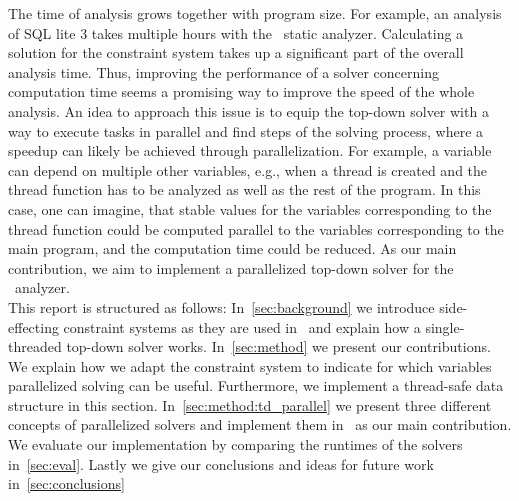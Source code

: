 The time of analysis grows together with program size. For example, an analysis of SQL lite 3 takes multiple hours with the \gob\ static analyzer. Calculating a solution for the constraint system takes up a significant part of the overall analysis time. Thus, improving the performance of a solver concerning computation time seems a promising way to improve the speed of the whole analysis. An idea to approach this issue is to equip the top-down solver with a way to execute tasks in parallel and find steps of the solving process, where a speedup can likely be achieved through parallelization. For example, a variable can depend on multiple other variables, e.g., when a thread is created and the thread function has to be analyzed as well as the rest of the program. In this case, one can imagine, that stable values for the variables corresponding to the thread function could be computed parallel to the variables corresponding to the main program, and the computation time could be reduced.
As our main contribution, we aim to implement a parallelized top-down solver for the \gob\ analyzer.\\
This report is structured as follows: In~\autoref{sec:background} we introduce side-effecting constraint systems as they are used in \gob\ and explain how a single-threaded top-down solver works. In~\autoref{sec:method} we present our contributions. We explain how we adapt the constraint system to indicate for which variables parallelized solving can be useful. Furthermore, we implement a thread-safe data structure in this section. In~\autoref{sec:method:td_parallel} we present three different concepts of parallelized solvers and implement them in \gob\ as our main contribution. We evaluate our implementation by comparing the runtimes of the solvers in~\autoref{sec:eval}. Lastly we give our conclusions and ideas for future work in~\autoref{sec:conclusions}
